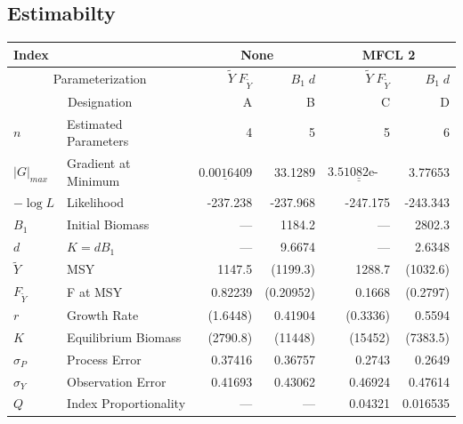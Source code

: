\documentclass[letterpaper,KOMA,landscape,titlepage]{powersem}
\newcommand\MSY{\widetilde{Y}}
\newcommand\Fmsy{F_{\MSY}}
\newcommand\MSYFmsy{\MSY\;\Fmsy}
\newcommand\Bd{B_1\; d}
\begin{document}
\begin{slide}\section{Estimabilty}
{\scriptsize
\label{tag:ests4}
\begin{center}
\begin{tabular}{|ll|rr|rr|}
\hline
Index && \multicolumn{2}{c|}{None}&\multicolumn{2}{c|}{MFCL 2}\\
\hline
\multicolumn{2}{|c|}{Parameterization}&$\MSYFmsy$&$\Bd$&$\MSYFmsy$&$\Bd$\\
\multicolumn{2}{|c|}{Designation}& A & B& C& D\\
\hline
\hline
$n$ & Estimated Parameters &4 & 5 & 5 & 6\\
$|G|_{max}$& Gradient at Minimum & $\underline{\mbox{0.0016409}}$ & 33.1289 &
$\underline{\underline{\mbox{3.51082e-05}}}$ & 3.77653\\
$-\log L$& Likelihood & -237.238 & -237.968 & -247.175 & -243.343\\
\hline
$B_1$& Initial Biomass & --- & 1184.2 & --- & 2802.3\\
$d$ &$K=dB_1$ & --- & 9.6674 & --- & 2.6348\\
$\MSY$& MSY & 1147.5 & (1199.3) & 1288.7 & (1032.6)\\
$\Fmsy$& F at MSY & 0.82239 & (0.20952) & 0.1668 & (0.2797)\\
$r$& Growth Rate & (1.6448) & 0.41904 & (0.3336) & 0.5594\\
$K$& Equilibrium Biomass & (2790.8) & (11448) & (15452) & (7383.5)\\
$\sigma_P$& Process Error & 0.37416 & 0.36757 & 0.2743 & 0.2649\\
$\sigma_Y$& Observation Error & 0.41693 & 0.43062 & 0.46924 & 0.47614\\
$Q$& Index Proportionality  & --- & --- & 0.04321 & 0.016535\\
\hline
\end{tabular}
\end{center}
}
\end{slide}
\end{document}
